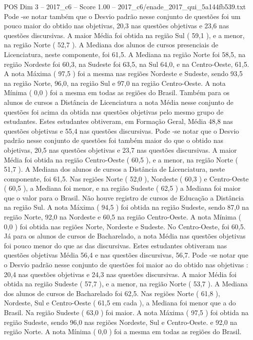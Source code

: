 \begin{textsample}{POS Dim 3 – 2017\_c6 – Score 1.00 – 2017\_c6/enade\_2017\_qui\_5a144fb539.txt}
Pode -se notar também que o Desvio padrão nesse conjunto de questões foi um pouco maior do obtido nas objetivas, 20,3 nas questões objetivas e 23,6 nas questões discursivas.
A maior Média foi obtida na região Sul ( 59,1 ), e a menor, na região Norte ( 52,7 ).
A Mediana dos alunos de cursos presenciais de Licenciatura, neste componente, foi 61,5.
A Mediana na região Norte foi 58,5, na região Nordeste foi 60,3, na Sudeste foi 63,5, na Sul 64,0, e na Centro-Oeste, 61,5.
A nota Máxima ( 97,5 ) foi a mesma nas regiões Nordeste e Sudeste, sendo 93,5 na região Norte, 96,0, na região Sul e 97,0 na região Centro-Oeste.
A nota Mínima ( 0,0 ) foi a mesma em todas as regiões do Brasil.
Também para os alunos de cursos a Distância de Licenciatura a nota Média nesse conjunto de questões foi acima da obtida nas questões objetivas pelo mesmo grupo de estudantes.
Estes estudantes obtiveram, em Formação Geral, Média 48,8 nas questões objetivas e 55,4 nas questões discursivas.
Pode -se notar que o Desvio padrão nesse conjunto de questões foi também maior do que o obtido nas objetivas, 20,5 nas questões objetivas e 23,7 nas questões discursivas.
A maior Média foi obtida na região Centro-Oeste ( 60,5 ), e a menor, na região Norte ( 51,7 ).
A Mediana dos alunos de cursos a Distância de Licenciatura, neste componente, foi 61,5.
Nas regiões Norte ( 52,0 ), Nordeste ( 60,3 ) e Centro-Oeste ( 60,5 ), a Mediana foi menor, e na região Sudeste ( 62,5 ) a Mediana foi maior que o valor para o Brasil.
Não houve registro de cursos de Educação a Distância na região Sul.
A nota Máxima ( 94,5 ) foi obtida na região Sudeste, sendo 87,0 na região Norte, 92,0 na Nordeste e 60,5 na região Centro-Oeste.
A nota Mínima ( 0,0 ) foi obtida nas regiões Norte, Nordeste e Sudeste.
No Centro-Oeste, foi 60,5.
Já para os alunos de cursos de Bacharelado, a nota Média nas questões objetivas foi pouco menor do que as das discursivas.
Estes estudantes obtiveram nas questões objetivas Média 56,4 e nas questões discursivas, 56,7.
Pode -se notar que o Desvio padrão nesse conjunto de questões foi maior ao do obtido nas objetivas : 20,4 nas questões objetivas e 24,3 nas questões discursivas.
A maior Média foi obtida na região Sudeste ( 57,7 ), e a menor, na região Norte ( 53,7 ).
A Mediana dos alunos de cursos de Bacharelado foi 62,5.
Nas regiões Norte ( 61,8 ), Nordeste, Sul e Centro-Oeste ( 61,5 em cada ), a Mediana foi menor que a do Brasil.
Na região Sudeste ( 63,0 ) foi maior.
A nota Máxima ( 97,5 ) foi obtida na região Sudeste, sendo 96,0 nas regiões Nordeste, Sul e Centro-Oeste. e 92,0 na região Norte.
A nota Mínima ( 0,0 ) foi a mesma em todas as regiões do Brasil.

\end{textsample}
